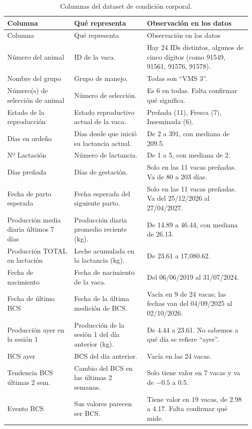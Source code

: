 \documentclass[11pt,letterpaper,DIV=12]{scrartcl}
\begin{document}
\begin{small}
\begin{longtable}{L{4cm}L{4.5cm}L{6.5cm}}
\caption{Columnas del dataset de condición corporal.}\\
\toprule
Columna & Qué representa & Observación en los datos \\
\midrule
\endfirsthead
\toprule
Columna & Qué representa & Observación en los datos \\
\midrule
\endhead
\bottomrule
\endfoot
Número del animal & ID de la vaca. & Hay 24 IDs distintos, algunos de cinco dígitos (como 91549, 91561, 91576, 91578). \\
Nombre del grupo & Grupo de manejo. & Todas son ``VMS 3''. \\
Número(s) de selección de animal & Número de selección. & Es 6 en todas. Falta confirmar qué significa. \\
Estado de la reproducción & Estado reproductivo actual de la vaca. & Preñada (11), Fresca (7), Inseminada (6). \\
Días en ordeño & Días desde que inició su lactancia actual. & De 2 a 391, con mediana de 209.5. \\
Nº Lactación & Número de lactancia. & De 1 a 5, con mediana de 2. \\
Días preñada & Días de gestación. & Solo en las 11 vacas preñadas. Va de 80 a 203 días. \\
Fecha de parto esperada & Fecha esperada del siguiente parto. & Solo en las 11 vacas preñadas. Va del 25/12/2026 al 27/04/2027. \\
Producción media diaria últimos 7 días & Producción diaria promedio reciente (kg). & De 14.89 a 46.44, con mediana de 26.13. \\
Producción TOTAL en lactación & Leche acumulada en la lactancia (kg). & De 23.61 a 17,080.62. \\
Fecha de nacimiento & Fecha de nacimiento de la vaca. & Del 06/06/2019 al 31/07/2024. \\
Fecha de último BCS & Fecha de la última medición de BCS. & Vacía en 9 de 24 vacas; las fechas van del 04/09/2025 al 02/10/2026. \\
Producción ayer en la sesión 1 & Producción de la sesión 1 del día anterior (kg). & De 4.44 a 23.61. No sabemos a qué día se refiere ``ayer''. \\
BCS ayer & BCS del día anterior. & Vacía en las 24 vacas. \\
Tendencia BCS últimas 2 sem. & Cambio del BCS en las últimas 2 semanas. & Solo tiene valor en 7 vacas y va de $-0.5$ a 0.5. \\
Evento BCS & Sus valores parecen ser BCS. & Tiene valor en 19 vacas, de 2.98 a 4.17. Falta confirmar qué mide. \\
\end{longtable}
\end{small}
\end{document}
